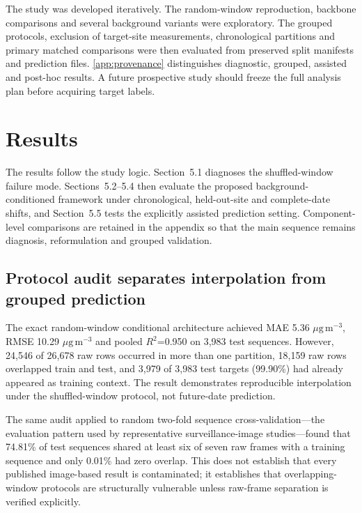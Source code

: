 \documentclass[review,12pt,authoryear]{elsarticle}
\newcommand{\ugm}{\ensuremath{\mu\mathrm{g}\,\mathrm{m}^{-3}}}
\newcommand{\Rtwo}{\ensuremath{R^2}}
\begin{document}
The study was developed iteratively. The random-window reproduction, backbone
comparisons and several background variants were exploratory. The grouped
protocols, exclusion of target-site measurements, chronological partitions and
primary matched comparisons were then evaluated from preserved split manifests
and prediction files. \ref{app:provenance} distinguishes diagnostic,
grouped, assisted and post-hoc results. A future prospective study should freeze
the full analysis plan before acquiring target labels.

\section{Results}

The results follow the study logic. Section~5.1 diagnoses the shuffled-window
failure mode. Sections~5.2--5.4 then evaluate the proposed
background-conditioned framework under chronological, held-out-site and
complete-date shifts, and Section~5.5 tests the explicitly assisted prediction
setting. Component-level comparisons are retained in the appendix so that the
main sequence remains diagnosis, reformulation and grouped validation.

\subsection{Protocol audit separates interpolation from grouped prediction}

The exact random-window conditional architecture achieved MAE 5.36 \ugm,
RMSE 10.29 \ugm{} and pooled \Rtwo=0.950 on 3,983 test sequences. However,
24,546 of 26,678 raw rows occurred in more than one partition, 18,159 raw rows
overlapped train and test, and 3,979 of 3,983 test targets (99.90\%) had already
appeared as training context. The result demonstrates reproducible interpolation
under the shuffled-window protocol, not future-date prediction.

The same audit applied to random two-fold sequence cross-validation---the
evaluation pattern used by representative surveillance-image studies---found
that 74.81\% of test sequences shared at least six of seven raw frames with a
training sequence and only 0.01\% had zero overlap. This does not establish
that every published image-based result is contaminated; it establishes that
overlapping-window protocols are structurally vulnerable unless raw-frame
separation is verified explicitly.
\end{document}
